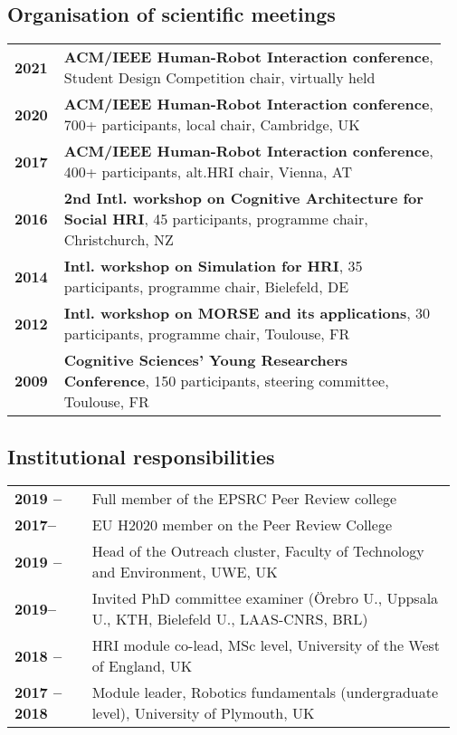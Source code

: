 \subsection{Organisation of scientific meetings}

\begin{tabular}{p{0.1\linewidth}p{0.85\linewidth}}
    \bf 2021 & \textbf{ACM/IEEE Human-Robot Interaction conference}, Student
    Design Competition chair, virtually held \\
    \bf 2020 & \textbf{ACM/IEEE Human-Robot Interaction conference}, 700+ participants, local chair, Cambridge, UK \\
    \bf 2017 & \textbf{ACM/IEEE Human-Robot Interaction conference}, 400+
    participants, alt.HRI chair, Vienna, AT \\
    \bf 2016 & \textbf{2nd Intl. workshop on Cognitive Architecture for Social HRI}, 45 participants, programme chair, Christchurch, NZ \\
    \bf 2014 & \textbf{Intl. workshop on Simulation for HRI}, 35 participants, programme chair, Bielefeld, DE \\
    \bf 2012 & \textbf{Intl. workshop on MORSE and its applications}, 30 participants, programme chair, Toulouse, FR \\
    \bf 2009 & \textbf{Cognitive Sciences’ Young Researchers Conference}, 150 participants, steering committee, Toulouse, FR \\
\end{tabular}

\subsection{Institutional responsibilities}

\begin{tabular}{p{0.17\linewidth}p{0.8\linewidth}}
    \bf 2019 -- & Full member of the EPSRC Peer Review college \\
    \bf 2017-- & EU H2020 member on the Peer Review College \\
    \bf 2019 -- & Head of the Outreach cluster, Faculty of Technology and Environment, UWE, UK \\
    \bf 2019-- & Invited PhD committee examiner (Örebro U., Uppsala U., KTH,
    Bielefeld U., LAAS-CNRS, BRL)\\
    \bf 2018 -- & HRI module co-lead, MSc level, University of the West of England, UK  \\
    \bf 2017 -- 2018 & Module leader, Robotics fundamentals (undergraduate level), University of Plymouth, UK \\
\end{tabular}

